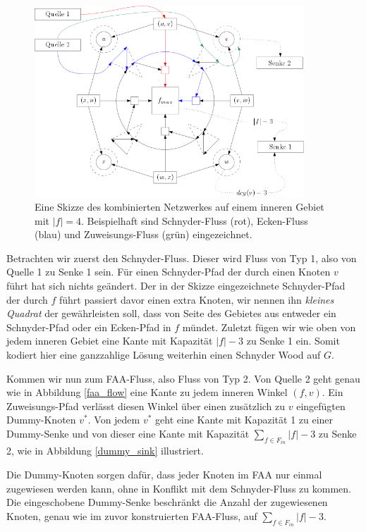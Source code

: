 \begin{figure}[h]
	\centering
  	\includegraphics[width=0.9\textwidth]{combined_face_sketch.png}
  	\caption{Eine Skizze des kombinierten Netzwerkes auf einem inneren Gebiet mit $|f| = 4$. Beispielhaft sind Schnyder-Fluss (rot), Ecken-Fluss (blau) und Zuweisungs-Fluss (grün) eingezeichnet. }
	\label{combined_face_sketch}
\end{figure}

Betrachten wir zuerst den Schnyder-Fluss. Dieser wird Fluss von Typ 1, also von Quelle 1 zu Senke 1 sein. Für einen Schnyder-Pfad der durch einen Knoten $v$ führt hat sich nichts geändert. Der in der Skizze eingezeichnete Schnyder-Pfad der durch $f$ führt passiert davor einen extra Knoten, wir nennen ihn \textit{kleines Quadrat} der gewährleisten soll, dass von Seite des Gebietes aus entweder ein Schnyder-Pfad oder ein Ecken-Pfad in $f$ mündet. Zuletzt fügen wir wie oben von jedem inneren Gebiet eine Kante mit Kapazität $|f|-3$ zu Senke 1 ein. Somit kodiert hier eine ganzzahlige Lösung weiterhin einen Schnyder Wood auf $G$.\

Kommen wir nun zum FAA-Fluss, also Fluss von Typ 2. Von Quelle 2 geht genau wie in Abbildung \ref{faa_flow} eine Kante zu jedem inneren Winkel $(f,v)$. Ein Zuweisungs-Pfad verlässt diesen Winkel über einen zusätzlich zu $v$ eingefügten Dummy-Knoten $v^*$. Von jedem $v^*$ geht eine Kante mit Kapazität 1 zu einer Dummy-Senke und von dieser eine Kante mit Kapazität $\sum_{f \in F_{in}} |f|-3$ zu Senke 2, wie in Abbildung \ref{dummy_sink} illustriert.

Die Dummy-Knoten sorgen dafür, dass jeder Knoten im FAA nur einmal zugewiesen werden kann, ohne in Konflikt mit dem Schnyder-Fluss zu kommen. Die eingeschobene Dummy-Senke beschränkt die Anzahl der zugewiesenen Knoten, genau wie im zuvor konstruierten FAA-Fluss, auf $\sum_{f \in F_{in}} |f|-3$.

